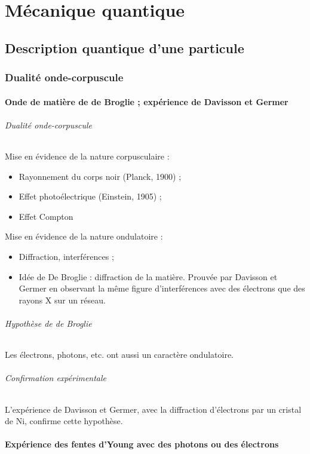 \documentclass[french]{book}
\theoremstyle{plain}
\theoremstyle{definition}
\theoremstyle{remark}
\begin{document}
\part{Mécanique quantique}
\chapter{Description quantique d'une particule}
\localtableofcontents
\section{Dualité onde-corpuscule}
\subsection{Onde de matière de de Broglie ; expérience de Davisson et Germer}
\paragraph{Dualité onde-corpuscule}
Mise en évidence de la nature corpusculaire :
\begin{itemize}
	\item Rayonnement du corps noir (Planck, 1900) ;
	\item Effet photoélectrique (Einstein, 1905) ;
	\item Effet Compton
\end{itemize}
Mise en évidence de la nature ondulatoire :
\begin{itemize}
	\item Diffraction, interférences ;
	\item Idée de De Broglie : diffraction de la matière. Prouvée par Davisson et Germer en observant la même figure d'interférences avec des électrons que des rayons X sur un réseau.
\end{itemize}
\paragraph{Hypothèse de de Broglie} Les électrons, photons, etc. ont aussi un caractère ondulatoire.
\paragraph{Confirmation expérimentale} L'expérience de Davisson et Germer, avec la diffraction d'électrons par un cristal de Ni, confirme cette hypothèse.
\subsection{Expérience des fentes d'Young avec des photons ou des électrons}
\end{document}
